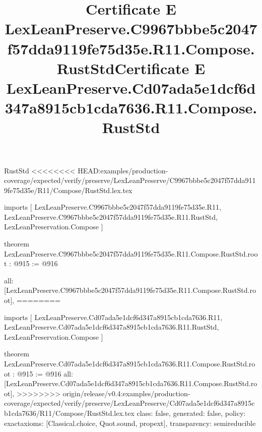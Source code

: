 \begin{lexlean}{RustStd}
<<<<<<<< HEAD:examples/production-coverage/expected/verify/preserve/LexLeanPreserve/C9967bbbe5c2047f57dda9119fe75d35e/R11/Compose/RustStd.lex.tex
\title{Certificate E LexLeanPreserve.C9967bbbe5c2047f57dda9119fe75d35e.R11.Compose.RustStd}
\begin{coremodule}
imports [
  LexLeanPreserve.C9967bbbe5c2047f57dda9119fe75d35e.R11,
  LexLeanPreserve.C9967bbbe5c2047f57dda9119fe75d35e.R11.RustStd,
  LexLeanPreservation.Compose
]

theorem LexLeanPreserve.C9967bbbe5c2047f57dda9119fe75d35e.R11.Compose.RustStd.root : @915 := @916 {
  all: [LexLeanPreserve.C9967bbbe5c2047f57dda9119fe75d35e.R11.Compose.RustStd.root],
========
\title{Certificate E LexLeanPreserve.Cd07ada5e1dcf6d347a8915cb1cda7636.R11.Compose.RustStd}
\begin{coremodule}
imports [
  LexLeanPreserve.Cd07ada5e1dcf6d347a8915cb1cda7636.R11,
  LexLeanPreserve.Cd07ada5e1dcf6d347a8915cb1cda7636.R11.RustStd,
  LexLeanPreservation.Compose
]

theorem LexLeanPreserve.Cd07ada5e1dcf6d347a8915cb1cda7636.R11.Compose.RustStd.root : @915 := @916 {
  all: [LexLeanPreserve.Cd07ada5e1dcf6d347a8915cb1cda7636.R11.Compose.RustStd.root],
>>>>>>>> origin/release/v0.4:examples/production-coverage/expected/verify/preserve/LexLeanPreserve/Cd07ada5e1dcf6d347a8915cb1cda7636/R11/Compose/RustStd.lex.tex
  class: false,
  generated: false,
  policy: exact{axioms: [Classical.choice, Quot.sound, propext]},
  transparency: semireducible
}


\end{coremodule}}
\end{coremodule}
\end{lexlean}
